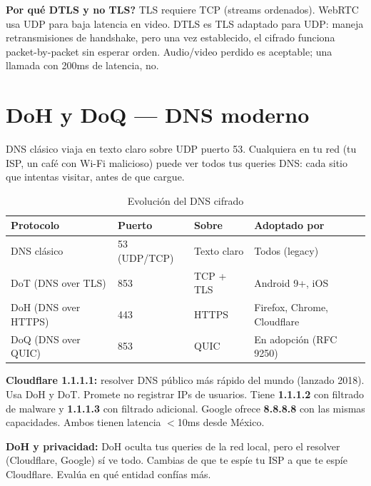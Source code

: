 \begin{ejemplo}
\textbf{Por qué DTLS y no TLS?} TLS requiere TCP (streams ordenados).
WebRTC usa UDP para baja latencia en video. DTLS es TLS adaptado para UDP:
maneja retransmisiones de handshake, pero una vez establecido, el
cifrado funciona packet-by-packet sin esperar orden.
Audio/video perdido es aceptable; una llamada con 200ms de latencia, no.
\end{ejemplo}

\section{ DoH y DoQ --- DNS moderno}

\begin{concepto}
DNS clásico viaja en texto claro sobre UDP puerto 53. Cualquiera en tu
red (tu ISP, un café con Wi-Fi malicioso) puede ver todos tus
queries DNS: cada sitio que intentas visitar, antes de que cargue.
\end{concepto}

\begin{table}[h!]
\centering
\renewcommand{\arraystretch}{1.4}
\begin{tabular}{llll}
\toprule
\textbf{Protocolo} & \textbf{Puerto} & \textbf{Sobre} & \textbf{Adoptado por} \\
\midrule
DNS clásico         & 53 (UDP/TCP) & Texto claro & Todos (legacy) \\
DoT (DNS over TLS)  & 853          & TCP + TLS   & Android 9+, iOS \\
DoH (DNS over HTTPS)& 443          & HTTPS       & Firefox, Chrome, Cloudflare \\
DoQ (DNS over QUIC) & 853          & QUIC        & En adopción (RFC 9250) \\
\bottomrule
\end{tabular}
\caption{Evolución del DNS cifrado}
\end{table}

\begin{moderno}
\textbf{ Cloudflare 1.1.1.1:} resolver DNS público más
rápido del mundo (lanzado 2018). Usa DoH y DoT. Promete no registrar
IPs de usuarios. Tiene \textbf{1.1.1.2} con filtrado de malware y
\textbf{1.1.1.3} con filtrado adicional. Google ofrece \textbf{8.8.8.8}
con las mismas capacidades. Ambos tienen latencia $<$10ms desde México.
\end{moderno}

\begin{cuidado}
\textbf{DoH y privacidad:} DoH oculta tus queries de la red local, pero
el resolver (Cloudflare, Google) sí ve todo. Cambias de que te espíe
tu ISP a que te espíe Cloudflare. Evalúa en qué entidad confías más.
\end{cuidado}


